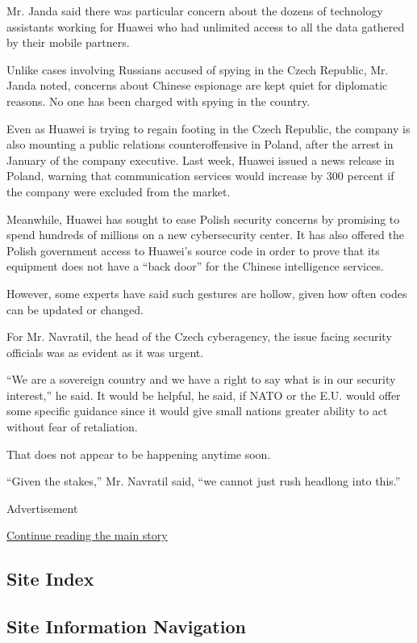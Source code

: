 Mr. Janda said there was particular concern about the dozens of
technology assistants working for Huawei who had unlimited access to all
the data gathered by their mobile partners.

Unlike cases involving Russians accused of spying in the Czech Republic,
Mr. Janda noted, concerns about Chinese espionage are kept quiet for
diplomatic reasons. No one has been charged with spying in the country.

Even as Huawei is trying to regain footing in the Czech Republic, the
company is also mounting a public relations counteroffensive in Poland,
after the arrest in January of the company executive. Last week, Huawei
issued a news release in Poland, warning that communication services
would increase by 300 percent if the company were excluded from the
market.

Meanwhile, Huawei has sought to ease Polish security concerns by
promising to spend hundreds of millions on a new cybersecurity center.
It has also offered the Polish government access to Huawei's source code
in order to prove that its equipment does not have a ``back door'' for
the Chinese intelligence services.

However, some experts have said such gestures are hollow, given how
often codes can be updated or changed.

For Mr. Navratil, the head of the Czech cyberagency, the issue facing
security officials was as evident as it was urgent.

``We are a sovereign country and we have a right to say what is in our
security interest,'' he said. It would be helpful, he said, if NATO or
the E.U. would offer some specific guidance since it would give small
nations greater ability to act without fear of retaliation.

That does not appear to be happening anytime soon.

``Given the stakes,'' Mr. Navratil said, ``we cannot just rush headlong
into this.''

Advertisement

\protect\hyperlink{after-bottom}{Continue reading the main story}

\hypertarget{site-index}{%
\subsection{Site Index}\label{site-index}}

\hypertarget{site-information-navigation}{%
\subsection{Site Information
Navigation}\label{site-information-navigation}}

